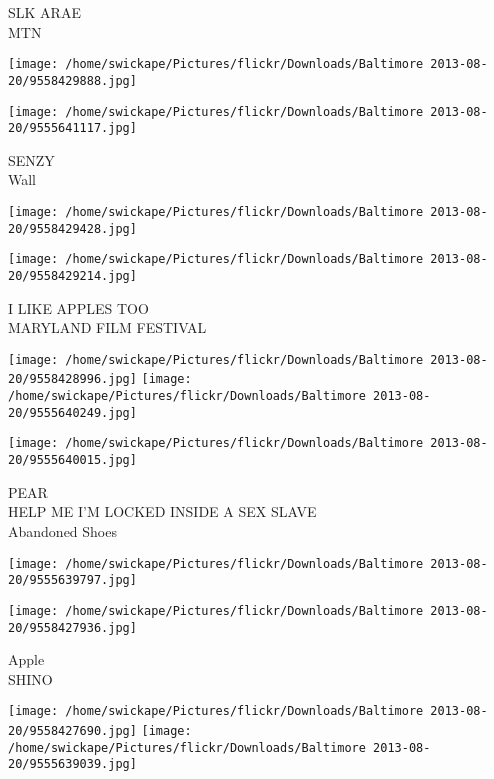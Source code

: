 \documentclass[10pt,letterpaper]{article}
\begin{document}
SLK ARAE\\
MTN\\
\pagebreak

\texttt{[image: /home/swickape/Pictures/flickr/Downloads/Baltimore 2013-08-20/9558429888.jpg]}

\vspace{0.25in}
\texttt{[image: /home/swickape/Pictures/flickr/Downloads/Baltimore 2013-08-20/9555641117.jpg]}

SENZY\\
Wall\\
\pagebreak

\texttt{[image: /home/swickape/Pictures/flickr/Downloads/Baltimore 2013-08-20/9558429428.jpg]}

\vspace{0.25in}
\texttt{[image: /home/swickape/Pictures/flickr/Downloads/Baltimore 2013-08-20/9558429214.jpg]}

I LIKE APPLES TOO\\
MARYLAND FILM FESTIVAL\\
\pagebreak

\texttt{[image: /home/swickape/Pictures/flickr/Downloads/Baltimore 2013-08-20/9558428996.jpg]}
\texttt{[image: /home/swickape/Pictures/flickr/Downloads/Baltimore 2013-08-20/9555640249.jpg]}

\vspace{0.25in}
\texttt{[image: /home/swickape/Pictures/flickr/Downloads/Baltimore 2013-08-20/9555640015.jpg]}

PEAR\\
HELP ME I'M LOCKED INSIDE A SEX SLAVE\\
Abandoned Shoes\\
\pagebreak

\texttt{[image: /home/swickape/Pictures/flickr/Downloads/Baltimore 2013-08-20/9555639797.jpg]}

\vspace{0.25in}
\texttt{[image: /home/swickape/Pictures/flickr/Downloads/Baltimore 2013-08-20/9558427936.jpg]}

Apple\\
SHINO\\
\pagebreak

\texttt{[image: /home/swickape/Pictures/flickr/Downloads/Baltimore 2013-08-20/9558427690.jpg]}
\texttt{[image: /home/swickape/Pictures/flickr/Downloads/Baltimore 2013-08-20/9555639039.jpg]}
\end{document}
